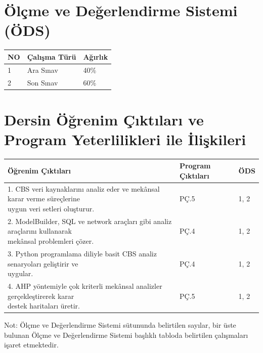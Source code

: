 \documentclass[10pt]{article}
\begin{document}
\section*{Ölçme ve Değerlendirme Sistemi (ÖDS)}
\begin{tabularx}{\textwidth}{|l|X|X|}
\hline
\textbf{NO}&
\textbf{Çalışma Türü} & \textbf{Ağırlık} \\
\hline
1 & Ara Sınav & 40\% \\
\hline
2 & Son Sınav & 60\% \\
\hline
\end{tabularx}

\section*{Dersin Öğrenim Çıktıları ve Program Yeterlilikleri ile İlişkileri}
\begin{tabularx}{\textwidth}{|l|X|X|}
\hline
\textbf{Öğrenim Çıktıları} & \textbf{Program Çıktıları} & \textbf{ÖDS} \\
\hline
\makecell[l]{1. CBS veri kaynaklarını analiz eder ve mekânsal karar verme süreçlerine \\ uygun veri setleri oluşturur.} & PÇ.5 & 1, 2 \\
\hline
\makecell[l]{2. ModelBuilder, SQL ve network araçları gibi analiz araçlarını kullanarak \\ mekânsal problemleri çözer.} & PÇ.4 & 1, 2 \\
\hline
\makecell[l]{3. Python programlama diliyle basit CBS analiz senaryoları geliştirir ve \\ uygular.} & PÇ.4 & 1, 2 \\
\hline
\makecell[l]{4. AHP yöntemiyle çok kriterli mekânsal analizler gerçekleştirerek karar \\ destek haritaları üretir.} & PÇ.5 & 1, 2 \\
\hline
\end{tabularx}

\footnotesize Not: Ölçme ve Değerlendirme Sistemi sütununda belirtilen sayılar, bir üste bulunan Ölçme ve Değerlendirme Sistemi başlıklı tabloda belirtilen çalışmaları işaret etmektedir.
\end{document}
